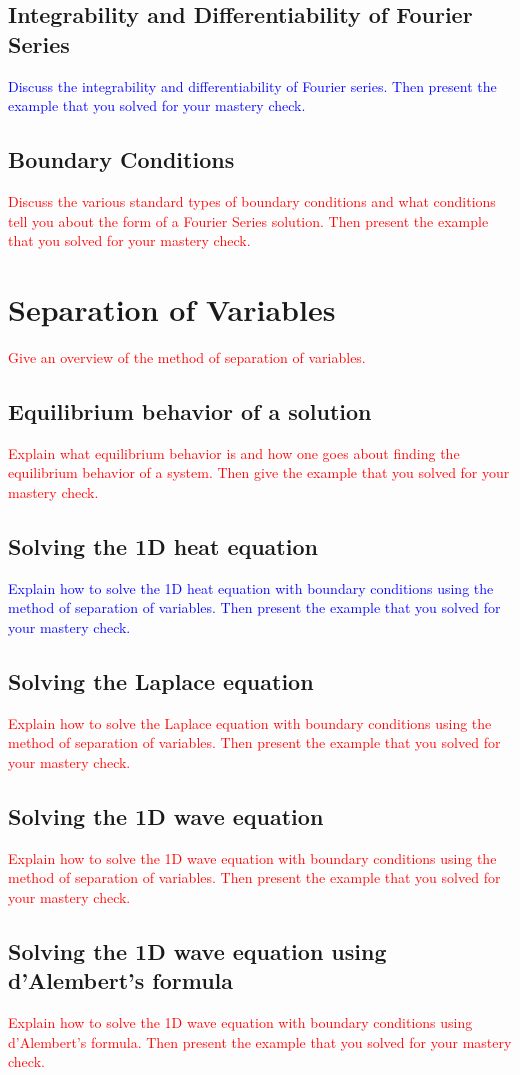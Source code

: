 \documentclass{article}
\newcommand{\red}[1]{\textcolor{red}{#1}}
\newcommand{\blue}[1]{\textcolor{blue}{#1}}
\begin{document}
\subsection{Integrability and Differentiability of Fourier Series}
\blue{Discuss the integrability and differentiability of Fourier series. Then present the example that you solved for your mastery check.}
\subsection{Boundary Conditions}
\red{Discuss the various standard types of boundary conditions and what conditions tell you about the form of a Fourier Series solution. Then present the example that you solved for your mastery check.}
\section{Separation of Variables}
\red{Give an overview of the method of separation of variables.}
\subsection{Equilibrium behavior of a solution}
\red{Explain what equilibrium behavior is and how one goes about finding the equilibrium behavior of a system. Then give the example that you solved for your mastery check.}
\subsection{Solving the 1D heat equation}
\blue{Explain how to solve the 1D heat equation with boundary conditions using the method of separation of variables. Then present the example that you solved for your mastery check.}
\subsection{Solving the Laplace equation}
\red{Explain how to solve the Laplace equation with boundary conditions using the method of separation of variables. Then present the example that you solved for your mastery check.}
\subsection{Solving the 1D wave equation}
\red{Explain how to solve the 1D wave equation with boundary conditions using the method of separation of variables. Then present the example that you solved for your mastery check.}
\subsection{Solving the 1D wave equation using d'Alembert's formula}
\red{Explain how to solve the 1D wave equation with boundary conditions using d'Alembert's formula. Then present the example that you solved for your mastery check.}
\begin{bibdiv}
\begin{biblist}
\end{biblist}
\end{bibdiv}
\end{document}
